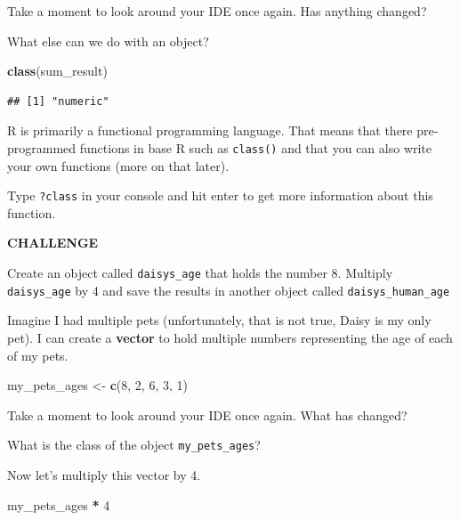\documentclass[
]{book}
\newenvironment{Shaded}{\begin{snugshade}}{\end{snugshade}}
\newcommand{\DecValTok}[1]{\textcolor[rgb]{0.00,0.00,0.81}{#1}}
\newcommand{\KeywordTok}[1]{\textcolor[rgb]{0.13,0.29,0.53}{\textbf{#1}}}
\newcommand{\NormalTok}[1]{#1}
\newcommand{\OperatorTok}[1]{\textcolor[rgb]{0.81,0.36,0.00}{\textbf{#1}}}
\newcommand{\StringTok}[1]{\textcolor[rgb]{0.31,0.60,0.02}{#1}}
\begin{document}
Take a moment to look around your IDE once again. Has anything changed?

What else can we do with an object?

\begin{Shaded}
\begin{Highlighting}[]
\KeywordTok{class}\NormalTok{(sum_result)}
\end{Highlighting}
\end{Shaded}

\begin{verbatim}
## [1] "numeric"
\end{verbatim}

R is primarily a functional programming language. That means that there pre-programmed functions in base R such as \texttt{class()} and that you can also write your own functions (more on that later).

Type \texttt{?class} in your console and hit enter to get more information about this function.

\textbf{CHALLENGE}

Create an object called \texttt{daisys\_age} that holds the number 8.
Multiply \texttt{daisys\_age} by 4 and save the results in another object called \texttt{daisys\_human\_age}

Imagine I had multiple pets (unfortunately, that is not true, Daisy is my only pet). I can create a \textbf{vector} to hold multiple numbers representing the age of each of my pets.

\begin{Shaded}
\begin{Highlighting}[]
\NormalTok{my_pets_ages <-}\StringTok{ }\KeywordTok{c}\NormalTok{(}\DecValTok{8}\NormalTok{, }\DecValTok{2}\NormalTok{, }\DecValTok{6}\NormalTok{, }\DecValTok{3}\NormalTok{, }\DecValTok{1}\NormalTok{)}
\end{Highlighting}
\end{Shaded}

Take a moment to look around your IDE once again. What has changed?

What is the class of the object \texttt{my\_pets\_ages}?

Now let's multiply this vector by 4.

\begin{Shaded}
\begin{Highlighting}[]
\NormalTok{my_pets_ages }\OperatorTok{*}\StringTok{ }\DecValTok{4}
\end{Highlighting}
\end{Shaded}
\end{document}
